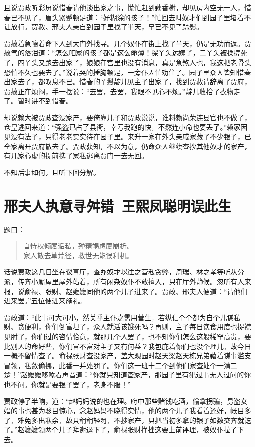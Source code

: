 \documentclass[12pt,oneside]{book}
\newenvironment{shici}{%
\begin{verse}%
\centering\large\hspace{12pt}}%
{\end{verse}}
\begin{document}
且说贾政听彩屏说惜春请他谈出家之事，慌忙赶到藕香榭，却见房内空无一人，惜春已不见了，眉头紧蹙顿足道：“好糊涂的孩子！”忙回去叫奴才们到园子里堵着不让放行。贾赦、邢夫人亲自到园子里找了半天，早已不见了踪影。

贾赦着急嚷着命下人到大门外找寻。几个奴仆在街上找了半天，仍是无功而返。贾赦气的落泪道：“怎么咱家的孩子都是这么命薄！探丫头远嫁了，二丫头被揉搓死了，四丫头又跑去出家了，娘娘在宫里也没有消息，真是急煞人也，我这把老骨头恐怕不久也要去了。”说着哭的捶胸顿足，一旁仆人忙劝住了。园子里众人皆知惜春出家去了，都叹息不已。惜春的丫鬟靛儿见主子出家了，找到贾赦请辞离了贾府，贾赦正在烦闷，手一摆说：“去罢，去罢，我眼不见心不烦。”靛儿收拾了衣物走了。暂时讲不到惜春。

却说赖大被贾政查没家产，要倚靠儿子和贾政说说，谁料赖尚荣连县官也不做了，仓皇逃回来道：“强盗已占了县衙，幸亏我跑的快，不然连小命也要丢了。”赖家因见没有法子，只得老老实实待在园子里。来升一家在外头亲戚家藏了不少银子，已全家离开贾府散去了。贾政获知，不以为意，仍命众人继续查抄其他奴才的家产，有几家心虚的提前携了家私逃离贾门一去无回。

不知后事如何，且听下回分解。

 
\chapter{邢夫人执意寻舛错~王熙凤聪明误此生}
题曰：

\begin{shici}
自恃权倾屡诟私，殚精竭虑厦崩析。\\
家人散去草荒径，救世无能误利机。
\end{shici}

话说贾政这几日坐在议事厅，查办奴才以往之营私贪弊，周瑞、林之孝等听从分派，传齐小厮屋里屋外站着，所有闲杂奴仆不敢擅入，只在厅外静候。忽听有人来报，说俞禄、张财、赵嬷嬷同他的两个儿子进来了。贾政、邢夫人便道：“请他们进来罢。”五位便进来施礼。

贾政道：“此事可大可小，然关乎主仆之需用营生，若纵信个个都为自个儿谋私财、贪便利，你们倒富坦了，众人就活该饿死吗？再则，主子每日饮食用度也捉襟见肘了，你们过的咨情恰意，就那几个人罢了，也不知你们怎么这般稀罕高贵，要比别人的命好些，你们富不富对主子又有何益？我包庇着你们也没个理儿，故今日一概不留情查了。俞禄张财查没家产，盖大观园时赵天梁赵天栋兄弟藉着谋事滥支冒领，私敛偷挪，此番一并处罚了。你们这一班十二个到他们家查处个一清二楚！”赵嬷嬷哆嗦着声音道：“你就只知道查家产，那园子里有犯过事无人过问的你也不问。你就是要银子罢了，老身不服！”

贾政停了半晌，道：“赵妈妈说的也在理。府中那些赌钱吃酒，偷拿拐骗，男盗女娼的事也甚为骇目惊心，念赵妈妈不晓得实情，他的两个儿子我看着还好，帐目多了，难免多出私余，故只稍稍轻罚，不抄家产，只把当初多拿的银子如数交齐就讫了。”赵嬷嬷领两个儿子拜谢退下了，俞禄张财挣挫这要上前评理，被奴仆拉了下去。
\end{document}
